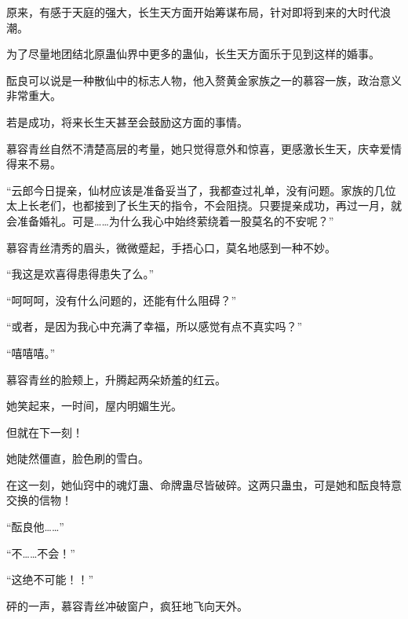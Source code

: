 \begin{this_body}
原来，有感于天庭的强大，长生天方面开始筹谋布局，针对即将到来的大时代浪潮。

为了尽量地团结北原蛊仙界中更多的蛊仙，长生天方面乐于见到这样的婚事。

酝良可以说是一种散仙中的标志人物，他入赘黄金家族之一的慕容一族，政治意义非常重大。

若是成功，将来长生天甚至会鼓励这方面的事情。

慕容青丝自然不清楚高层的考量，她只觉得意外和惊喜，更感激长生天，庆幸爱情得来不易。

“云郎今日提亲，仙材应该是准备妥当了，我都查过礼单，没有问题。家族的几位太上长老们，也都接到了长生天的指令，不会阻挠。只要提亲成功，再过一月，就会准备婚礼。可是……为什么我心中始终萦绕着一股莫名的不安呢？”

慕容青丝清秀的眉头，微微蹙起，手捂心口，莫名地感到一种不妙。

“我这是欢喜得患得患失了么。”

“呵呵呵，没有什么问题的，还能有什么阻碍？”

“或者，是因为我心中充满了幸福，所以感觉有点不真实吗？”

“嘻嘻嘻。”

慕容青丝的脸颊上，升腾起两朵娇羞的红云。

她笑起来，一时间，屋内明媚生光。

但就在下一刻！

她陡然僵直，脸色刷的雪白。

在这一刻，她仙窍中的魂灯蛊、命牌蛊尽皆破碎。这两只蛊虫，可是她和酝良特意交换的信物！

“酝良他……”

“不……不会！”

“这绝不可能！！”

砰的一声，慕容青丝冲破窗户，疯狂地飞向天外。

\end{this_body}

